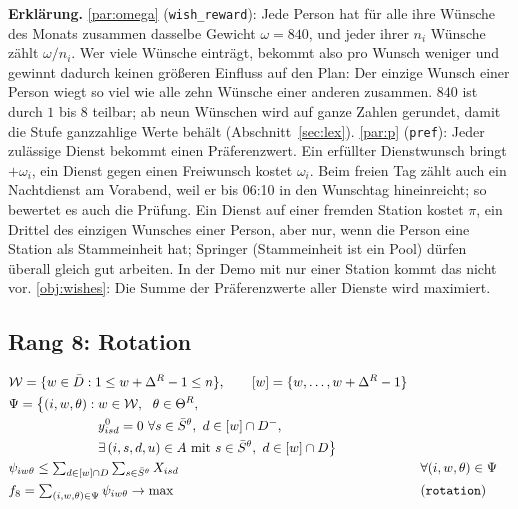 \documentclass[11pt]{combiArticle}
\newcommand{\Dm}{D^{-}}
\newcommand{\Db}{\bar{D}}
\newcommand{\Wr}{\mathcal{W}}
\newcommand{\code}[1]{\texttt{#1}}
\begin{document}
\textbf{Erklärung.}
\eqref{par:omega} (\code{wish\_reward}): Jede Person hat für alle ihre Wünsche des Monats zusammen dasselbe Gewicht
$\omega = 840$, und jeder ihrer $n_i$ Wünsche zählt $\omega / n_i$. Wer viele Wünsche einträgt, bekommt also pro
Wunsch weniger und gewinnt dadurch keinen größeren Einfluss auf den Plan: Der einzige Wunsch einer Person wiegt so
viel wie alle zehn Wünsche einer anderen zusammen. $840$ ist durch $1$ bis $8$ teilbar; ab neun Wünschen wird auf
ganze Zahlen gerundet, damit die Stufe ganzzahlige Werte behält (Abschnitt~\ref{sec:lex}).
\eqref{par:p} (\code{pref}): Jeder zulässige Dienst bekommt einen Präferenzwert. Ein erfüllter Dienstwunsch bringt
$+\omega_i$, ein Dienst gegen einen Freiwunsch kostet $\omega_i$. Beim freien Tag zählt auch ein Nachtdienst am
Vorabend, weil er bis 06:10 in den Wunschtag hineinreicht; so bewertet es auch die Prüfung. Ein Dienst auf einer
fremden Station kostet $\pi$, ein Drittel des einzigen Wunsches einer Person, aber nur, wenn die Person eine
Station als Stammeinheit hat; Springer (Stammeinheit ist ein Pool) dürfen überall gleich gut arbeiten. In der Demo
mit nur einer Station kommt das nicht vor.
\eqref{obj:wishes}: Die Summe der Präferenzwerte aller Dienste wird maximiert.

\subsection{Rang 8: Rotation}\label{sec:z:rotation}

\begin{align}
  & \Wr = \{w \in \Db : 1 \le w + \Delta^{R} - 1 \le n\},\qquad [w] = \{w,\dots,w + \Delta^{R} - 1\} \label{set:Wr}\\
  & \Psi = \bigl\{(i,w,\theta) : w \in \Wr,\ \ \theta \in \Theta^{R},
    \label{set:Psi}\\
  & \hphantom{\Psi = \bigl\{(i,w,\theta) :{}}
    y^{0}_{isd} = 0\ \forall s \in \bar S^{\theta},\ d \in [w] \cap \Dm, \notag\\
  & \hphantom{\Psi = \bigl\{(i,w,\theta) :{}}
    \exists\,(i,s,d,u) \in A \text{ mit } s \in \bar S^{\theta},\ d \in [w] \cap D\bigr\} \notag\\
  & \psi_{iw\theta} \le \textstyle\sum_{d \in [w] \cap D} \sum_{s \in \bar S^{\theta}} X_{isd} && \forall (i,w,\theta) \in \Psi \label{con:rotation}\\
  & f_8 = \textstyle\sum_{(i,w,\theta) \in \Psi} \psi_{iw\theta} \to \max && \text{(\code{rotation})} \label{obj:rotation}
\end{align}
\end{document}
